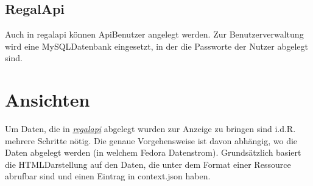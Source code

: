 \documentclass[letterpaper,10pt,english]{sphinxmanual}
\begin{document}
\subsection{Regal\sphinxhyphen{}Api}
\label{\detokenize{toscience:regal-api}}\label{\detokenize{toscience:id16}}
\sphinxAtStartPar
Auch in regal\sphinxhyphen{}api können Api\sphinxhyphen{}Benutzer angelegt werden. Zur
Benutzerverwaltung wird eine MySQL\sphinxhyphen{}Datenbank eingesetzt, in der die
Passworte der Nutzer abgelegt sind.


\section{Ansichten}
\label{\detokenize{toscience:ansichten}}\label{\detokenize{toscience:id17}}
\sphinxAtStartPar
Um Daten, die in {\hyperref[\detokenize{toscience:_regal_api_2}]{\emph{regal\sphinxhyphen{}api}}} abgelegt wurden zur
Anzeige zu bringen sind i.d.R. mehrere Schritte nötig. Die genaue
Vorgehensweise ist davon abhängig, wo die Daten abgelegt werden (in
welchem Fedora Datenstrom). Grundsätzlich basiert die HTML\sphinxhyphen{}Darstellung
auf den Daten, die unter dem Format  einer Ressource abrufbar
sind und einen Eintrag in context.json haben.
\end{document}
